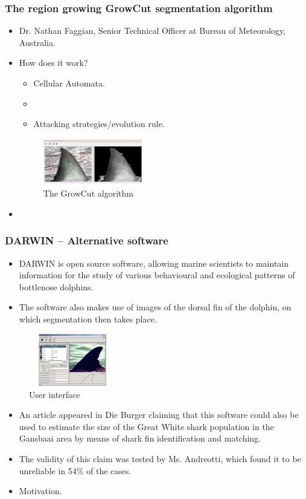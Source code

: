 \documentclass{beamer}
\newcommand{\myitem}{\item[$-$]}
\begin{document}
\begin{frame}
\frametitle{The region growing GrowCut segmentation algorithm}
\begin{itemize}
\item Dr. Nathan Faggian\cite{growcut}, Senior Technical Officer at Bureau
of Meteorology, Australia.
\item How does it work? 
\begin{itemize}
\myitem Cellular Automata\cite{cellularoutomata}.
\myitem
\myitem Attacking strategies/evolution rule.
\end{itemize}
\begin{figure}
\centering
\includegraphics[width=1.7in, height=0.8in]{haaim.png}
\caption{The GrowCut algorithm}
\end{figure}
\item
\end{itemize}
\end{frame}


\begin{frame}
\frametitle{DARWIN -- Alternative software}
\begin{itemize}
\item DARWIN\cite{Darwin} is open source software, allowing marine scientists to
maintain information for the study of various behavioural and ecological
patterns of bottlenose dolphins.
\item The software also makes use of images of the dorsal fin of the dolphin, on
which segmentation then takes place.
\end{itemize}
\begin{figure}
 \centering
 \includegraphics[width=1.5in, height=0.9in]{Darwin.jpg}
 \caption{User interface}
\end{figure}
\end{frame}

\begin{frame}
\begin{itemize}
\item An article\cite{Darwin} appeared in Die Burger claiming that this
software could also be used to estimate the size of the Great White shark
population in the Gansbaai area by means of shark fin identification and
matching.
\item The validity of this claim was tested by Ms. Andreotti, which found it to
be unreliable in 54\% of the cases.
\item Motivation.
\end{itemize}
\end{frame}
\end{document}
